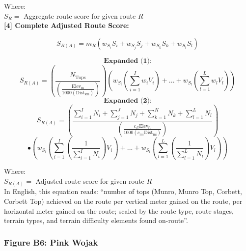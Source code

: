\documentclass[11pt, english]{article}
\begin{document}
	Where:\\
	$S_{R}=$ Aggregate route score for given route $R$\\

	\textbf{[4] Complete Adjusted Route Score:}

	$$S_{R(A)}=m_{R}\left(w_{S_{i}}S_{i}+w_{S_{j}}S_{j}+w_{S_{k}}S_{k}+w_{S_{l}}S_{l}\right)$$

	$$\textbf{Expanded (1):}$$
	$$S_{R(A)}=\left(\frac{N_{\mathrm{Tops}}}{\left(\frac{\mathrm{Elev_{m}}}{1000\left(\mathrm{Dist_{km}}\right)}\right)}\right)\left(w_{S_{i}}\left(\sum^{I}_{i=1} w_{i}V_{i}\right)+...+w_{S_{l}}\left(\sum^{L}_{l=1} w_{l}V_{l}\right)\right)$$
	$$\textbf{Expanded (2):}$$
	$$S_{R(A)}=\left(\frac{\sum^{I}_{i=1}N_{i}+\sum^{J}_{j=1}N_{j}+\sum^{K}_{k=1}N_{k}+\sum^{L}_{l=1}N_{l}}{\left(\frac{c_{ft}\mathrm{Elev_{ft}}}{1000\left(c_{mi}\mathrm{Dist_{mi}}\right)}\right)}\right)$$
	$$\bullet\left(w_{S_{i}}\left(\sum^{I}_{i=1} \left(\frac{1}{\sum^{I}_{i=1}N_{i}}\right)V_{i}\right)+...+w_{S_{l}}\left(\sum^{L}_{l=1} \left(\frac{1}{\sum^{L}_{l=1}N_{l}}\right)V_{l}\right)\right)$$

	Where:\\
	$S_{R(A)}=$ Adjusted route score for given route $R$\\

	In English, this equation reads: ``number of tops (Munro, Munro Top, Corbett, Corbett Top) achieved on the route per vertical meter gained on the route, per horizontal meter gained on the route; scaled by the route type, route stages, terrain types, and terrain difficulty elements found on-route''.\\

\newpage

		\subsubsection*{Figure B6: Pink Wojak}
	
\end{document}
